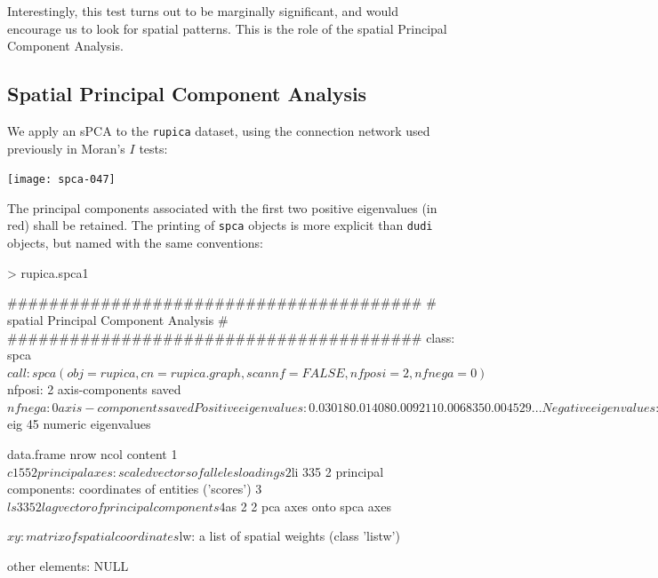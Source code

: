 \documentclass{article}
\begin{document}
\noindent Interestingly, this test turns out to be marginally significant, and would encourage us to
look for spatial patterns. This is the role of the spatial Principal Component Analysis.





\subsection{Spatial Principal Component Analysis}

We apply an sPCA to the \texttt{rupica} dataset, using the connection network used previously in
Moran's $I$ tests:
\begin{Schunk}
\end{Schunk}
\texttt{[image: spca-047]}

\noindent The principal components associated with the first two
positive eigenvalues (in red) shall be retained.
The printing of \texttt{spca} objects is more explicit than
\texttt{dudi} objects, but named with the same conventions:
\begin{Schunk}
\begin{Sinput}
> rupica.spca1
\end{Sinput}
\begin{Soutput}
	########################################
	# spatial Principal Component Analysis #
	########################################
class: spca
$call: spca(obj = rupica, cn = rupica.graph, scannf = FALSE, nfposi = 2, 
    nfnega = 0)

$nfposi: 2 axis-components saved
$nfnega: 0 axis-components saved
Positive eigenvalues: 0.03018 0.01408 0.009211 0.006835 0.004529 ...
Negative eigenvalues: -0.008611 -0.006414 -0.004451 -0.003963 -0.003329 ...

  vector length mode    content    
1 $eig   45     numeric eigenvalues

  data.frame nrow ncol content                                                 
1 $c1        55   2    principal axes: scaled vectors of alleles loadings      
2 $li        335  2    principal components: coordinates of entities ('scores')
3 $ls        335  2    lag vector of principal components                      
4 $as        2    2    pca axes onto spca axes                                 

$xy: matrix of spatial coordinates
$lw: a list of spatial weights (class 'listw')

other elements: NULL
\end{Soutput}
\end{Schunk}
\end{document}
